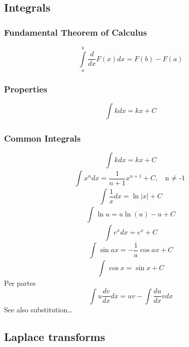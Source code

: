 \documentclass{article}
\begin{document}
	\subsection{Integrals}
		\subsubsection{Fundamental Theorem of Calculus}
			\begin{equation}
			\int\limits_a^b {\frac{d}{{dx}}F\left( x \right)dx} = F\left( b \right) - F\left( a \right)
			\end{equation}
		\subsubsection{Properties}
			\begin{equation}
				\int_{}^{}k dx = kx + C
			\end{equation}
		\subsubsection{Common Integrals}
			\begin{equation}
				\int_{}^{}k dx = kx + C
			\end{equation}
			\begin{equation}
				\int_{}^{}x^n dx = \frac{1}{n+1} x^{n+1} + C, \ \ \ \mbox{n $\neq$ -1}
			\end{equation}
			\begin{equation}
				\int_{}^{}\frac{1}{x} dx = \ln|x| + C
			\end{equation}
			\begin{equation}
				\int_{}^{}\ln u = u\ln(u)-u+C
			\end{equation}
			\begin{equation}
				\int_{}^{}e^x dx = e^x+C
			\end{equation}
			\begin{equation}
				\int_{}^{}\sin ax = -\frac{1}{a}\cos ax+C
			\end{equation}
			\begin{equation}
				\int_{}^{}\cos x = \sin x+C
			\end{equation}
			Per partes
			\begin{equation}
				\int {u\frac{{dv}}{{dx}}} dx = uv - \int {\frac{{du}}{{dx}}} vdx
			\end{equation}
			See also substitution\ldots
	\subsection{Laplace transforms}
\end{document}
